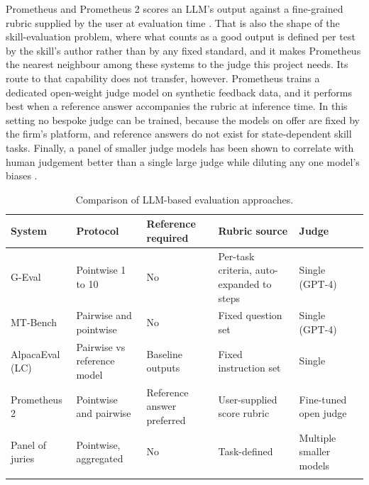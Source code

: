 Prometheus and Prometheus 2 scores an LLM's output against a fine-grained rubric supplied by the user at evaluation time \cite{kim2024prometheus}\cite{kim2024prometheus2}. That is also the shape of the skill-evaluation problem, where what counts as a good output is defined per test by the skill's author rather than by any fixed standard, and it makes Prometheus the nearest neighbour among these systems to the judge this project needs. Its route to that capability does not transfer, however. Prometheus trains a dedicated open-weight judge model on synthetic feedback data, and it performs best when a reference answer accompanies the rubric at inference time. In this setting no bespoke judge can be trained, because the models on offer are fixed by the firm's platform, and reference answers do not exist for state-dependent skill tasks. Finally, a panel of smaller judge models has been shown to correlate with human judgement better than a single large judge while diluting any one model's biases \cite{verga2024juries}.

\begin{table}[htbp]
    \centering
    \caption{Comparison of LLM-based evaluation approaches.}
    \label{tab:llm-evaluation-comparison}
    \footnotesize
    \setlength{\tabcolsep}{3pt}
    \renewcommand{\arraystretch}{1.2}

    \begin{tabularx}{\textwidth}{
        @{}*{6}{>{\raggedright\arraybackslash}X}@{}
    }
        \toprule
        \textbf{System} &
        \textbf{Protocol} &
        \textbf{Reference required} &
        \textbf{Rubric source} &
        \textbf{Judge} \\
        \midrule

        G-Eval \cite{liu2023geval} &
        Pointwise 1 to 10 &
        No &
        Per-task criteria, auto-expanded to steps &
        Single (GPT-4) \\
        \addlinespace

        MT-Bench \cite{zheng2023mtbench} &
        Pairwise and pointwise &
        No &
        Fixed question set &
        Single (GPT-4) \\
        \addlinespace

        AlpacaEval (LC)
        \cite{li2023alpacaeval,dubois2024lengthcontrolled} &
        Pairwise vs reference model &
        Baseline outputs &
        Fixed instruction set &
        Single \\
        \addlinespace

        Prometheus 2 \cite{kim2024prometheus2} &
        Pointwise and pairwise &
        Reference answer preferred &
        User-supplied score rubric &
        Fine-tuned open judge \\
        \addlinespace

        Panel of juries \cite{verga2024juries} &
        Pointwise, aggregated &
        No &
        Task-defined &
        Multiple smaller models \\
        \addlinespace

        \bottomrule
    \end{tabularx}
\end{table}

